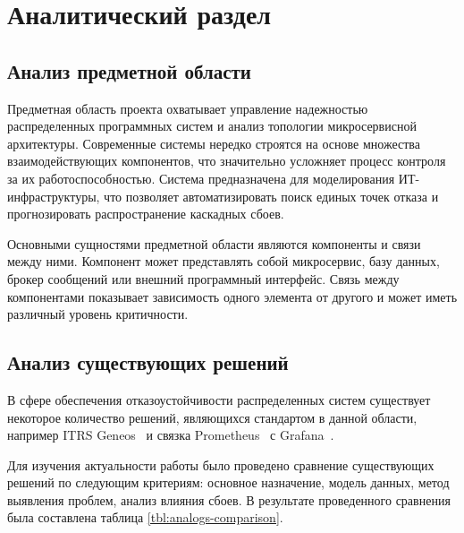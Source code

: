 \section{Аналитический раздел}

\subsection{Анализ предметной области}
Предметная область проекта охватывает управление надежностью распределенных программных
систем и анализ топологии микросервисной архитектуры. Современные системы нередко
строятся на основе множества взаимодействующих компонентов, что значительно усложняет
процесс контроля за их работоспособностью. Система предназначена для моделирования
ИТ-инфраструктуры, что позволяет автоматизировать поиск единых точек отказа и
прогнозировать распространение каскадных сбоев.

Основными сущностями предметной области являются компоненты и связи между ними. Компонент
может представлять собой микросервис, базу данных, брокер сообщений или внешний
программный интерфейс. Связь между компонентами показывает зависимость одного элемента от
другого и может иметь различный уровень критичности.

\subsection{Анализ существующих решений}
В сфере обеспечения отказоустойчивости распределенных систем существует некоторое
количество решений, являющихся стандартом в данной области, например 
ITRS Geneos~\cite{ref:geneos} и связка Prometheus~\cite{ref:prometheus} с Grafana~\cite{ref:grafana}.

Для изучения актуальности работы было проведено сравнение существующих решений по
следующим критериям: основное назначение, модель данных, метод выявления проблем, анализ
влияния сбоев. В результате проведенного сравнения была составлена таблица
\ref{tbl:analogs-comparison}.

